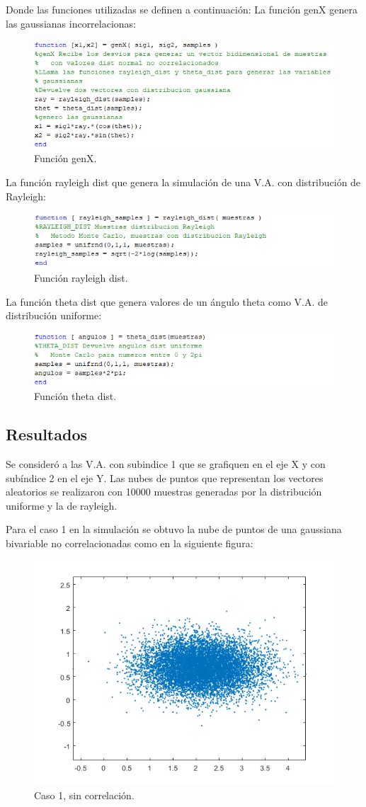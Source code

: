Donde las funciones utilizadas se definen a continuación:
La función genX genera las gaussianas incorrelacionas:
\begin{figure}[H]
	\centering
	\includegraphics[width=0.6\linewidth]{./ImagenesEjercicio2/genX.PNG}
	\caption{Función genX.}
	\label{fig:genX}
\end{figure}

La función rayleigh dist que genera la simulación de una V.A. con distribución de Rayleigh:
\begin{figure}[H]
	\centering
	\includegraphics[width=0.6\linewidth]{./ImagenesEjercicio2/ray.PNG}
	\caption{Función rayleigh dist.}
	\label{fig:ray}
\end{figure}

La función theta dist que genera valores de un ángulo theta como V.A. de distribución uniforme:
\begin{figure}[H]
	\centering
	\includegraphics[width=0.6\linewidth]{./ImagenesEjercicio2/theta.PNG}
	\caption{Función theta dist.}
	\label{fig:theta}
\end{figure}

\subsection*{Resultados}

Se consideró a las V.A. con subindice 1 que se grafiquen en el eje X y con subíndice 2 en el eje Y. Las nubes de puntos que representan los vectores aleatorios se realizaron con 10000 muestras generadas por la distribución uniforme y la de rayleigh.

Para el caso 1 en la simulación se obtuvo la nube de puntos de una gaussiana bivariable no correlacionadas como en la siguiente figura:

\begin{figure}[H]
	\centering
	\includegraphics[width=0.5\linewidth]{./ImagenesEjercicio2/GaussianaBivariableSinCorr1.PNG}
	\caption{Caso 1, sin correlación.}
	\label{fig:G1SC}
\end{figure}

